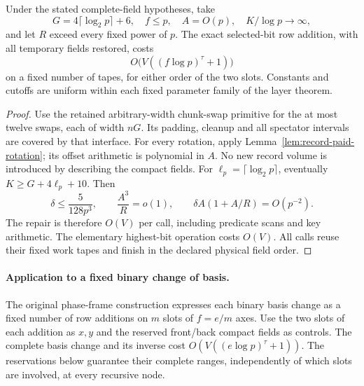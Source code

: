 \begin{proposition}
\label{prop:compact-selected-addition}
Under the stated complete-field hypotheses, take
\[
 G=4\lceil\log_2 p\rceil+6,\quad f\le p,\quad A=O(p),
 \quad K/\log p\longrightarrow\infty,
\]
and let $R$ exceed every fixed power of $p$. The exact selected-bit row
addition, with all temporary fields restored, costs
\[
 O\bigl(V((f\log p)^\tau+1)\bigr)
\]
on a fixed number of tapes, for either order of the two slots. Constants and
cutoffs are uniform within each fixed parameter family of the layer theorem.
\end{proposition}
\begin{proof}
Use the retained arbitrary-width chunk-swap primitive for the at most twelve
swaps, each of width $nG$. Its padding, cleanup and all spectator intervals
are covered by that interface. For every rotation, apply
Lemma~\ref{lem:record-paid-rotation}; its offset arithmetic is polynomial
in $A$. No new record volume is introduced by describing the compact fields.
For $\ell_p=\lceil\log_2 p\rceil$, eventually
$K\ge G+4\ell_p+10$. Then
\[
 \delta\le \frac{5}{128p^3},\qquad
 \frac{A^3}{R}=o(1),\qquad
 \delta A(1+A/R)=O(p^{-2}).
\]
The repair is therefore $O(V)$ per call, including predicate scans and key
arithmetic. The elementary highest-bit operation costs $O(V)$. All calls
reuse their fixed work tapes and finish in the declared physical field order.
\end{proof}

\paragraph{Application to a fixed binary change of basis.}
The original phase-frame construction expresses each binary basis change
as a fixed number of row additions on $m$ slots of $f=e/m$ axes. Use the
two slots of each addition as $x,y$ and the reserved front/back compact
fields as controls. The complete basis change and its inverse cost
$O(V((e\log p)^\tau+1))$. The reservations below guarantee their complete
ranges, independently of which slots are involved, at every recursive node.
